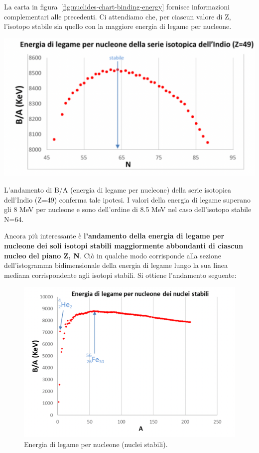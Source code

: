 La carta in figura~\ref{fig:nuclides-chart-binding-energy} fornisce informazioni complementari alle precedenti.
Ci attendiamo che, per ciascun valore di Z, l’isotopo stabile sia quello con la maggiore energia di legame per nucleone.
\begin{marginfigure}
    \centering
    \includegraphics{../figs/indium-binding-energy}
    \label{fig:}
\end{marginfigure}
L’andamento di B/A (energia di legame per nucleone) della serie isotopica dell’Indio (Z=49) conferma tale ipotesi.
I valori della energia di legame superano gli 8 MeV per nucleone e sono dell’ordine di 8.5 MeV nel caso dell’isotopo stabile N=64.

Ancora più interessante è \textbf{l’andamento della energia di legame per nucleone dei soli isotopi stabili maggiormente
abbondanti di ciascun nucleo del piano Z, N}.
Ciò in qualche modo corrisponde alla sezione dell’istogramma bidimensionale della energia di legame lungo la sua linea
mediana corrispondente agli isotopi stabili.
Si ottiene l’andamento seguente:
\begin{figure}
    \centering
    \includegraphics{../figs/binding-energy-stable}
    \caption{Energia di legame per nucleone (nuclei stabili).}
    \label{fig:binding-energy-stable}
\end{figure}
\bigskip

